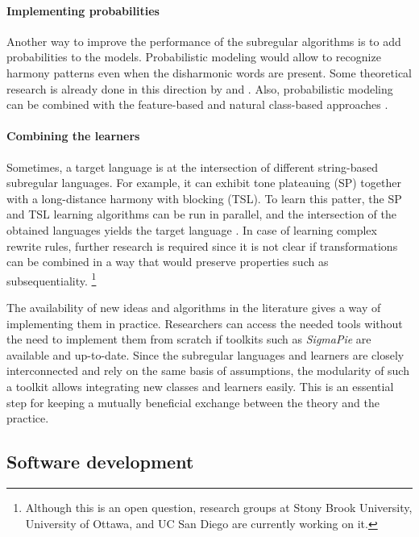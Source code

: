 \paragraph{Implementing probabilities}

Another way to improve the performance of the subregular algorithms is to add probabilities to the models.
Probabilistic modeling would allow to recognize harmony patterns even when the disharmonic words are present.
Some theoretical research is already done in this direction by \cite{HeinzRogers2010SPdist} and \cite{Shibata-Heinz-2019-MLEFRDSL}.
Also, probabilistic modeling can be combined with the feature-based and natural class-based approaches \citep{Heinz-Koirala-2010-MLEFD,VuZehfrooshEtal2018-SRLUSM}.

\paragraph{Combining the learners}
Sometimes, a target language is at the intersection of different string-based subregular languages.
For example, it can exhibit tone plateauing (SP) together with a long-distance harmony with blocking (TSL).
To learn this patter, the SP and TSL learning algorithms can be run in parallel, and the intersection of the obtained languages yields the target language \citep{Heinz10ldp,HeinzIdsardi13}.
In case of learning complex rewrite rules, further research is required since it is not clear if transformations can be combined in a way that would preserve properties such as subsequentiality.%
\footnote{Although this is an open question, research groups at Stony Brook University, University of Ottawa, and UC San Diego are currently working on it.}

\bigskip\bigskip

The availability of new ideas and algorithms in the literature gives a way of implementing them in practice.
Researchers can access the needed tools without the need to implement them from scratch if toolkits such as \emph{SigmaPie} are available and up-to-date.
Since the subregular languages and learners are closely interconnected and rely on the same basis of assumptions, the modularity of such a toolkit allows integrating new classes and learners easily.
This is an essential step for keeping a mutually beneficial exchange between the theory and the practice.


\subsection{Software development}

